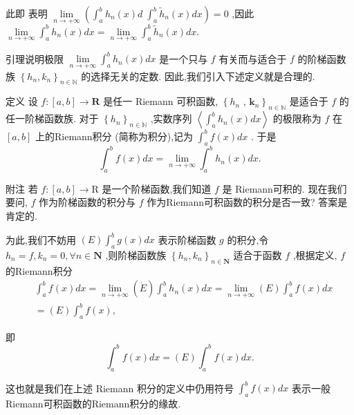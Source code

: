 此即 表明 $\mathop{\lim }\limits_{{n \rightarrow   + \infty }}\left( {{\int }_{a}^{b}{h}_{n}\left( x\right) d\;{\int }_{a}^{b}{\widetilde{h}}_{n}\left( x\right) {dx}}\right)  = 0$ ,因此 $\mathop{\lim }\limits_{{n \rightarrow   + \infty }}{\int }_{a}^{b}{h}_{n}\left( x\right) {dx} = \mathop{\lim }\limits_{{n \rightarrow   + \infty }}{\int }_{a}^{b}{\widetilde{h}}_{n}\left( x\right) {dx}.$

引理说明极限 $\mathop{\lim }\limits_{{n \rightarrow   + \infty }}{\int }_{a}^{b}{h}_{n}\left( x\right) {dx}$ 是一个只与 $f$ 有关而与适合于 $f$ 的阶梯函数族 ${\left\{  {h}_{n},{k}_{n}\right\}  }_{n \in  \mathbb{N}}$ 的选择无关的定数. 因此,我们引入下述定义就是合理的.

定义 设 $f : \left\lbrack  {a,b}\right\rbrack   \rightarrow  \mathbf{R}$ 是任一 Riemann 可积函数, $\left\{  {h}_{n}\right.$ , ${\left. {\mathbf{k}}_{n}\right\}  }_{n \in  \mathbb{N}}$ 是适合于 $f$ 的任一阶梯函数族. 对于 ${\left\{  {h}_{n}\right\}  }_{n \in  \mathbb{N}}$ ,实数序列 $\left\langle  {{\int }_{a}^{b}{h}_{n}\left( x\right) {dx}}\right\rangle$ 的极限称为 $f$ 在 $\left\lbrack  {a,b}\right\rbrack$ 上的Riemann积分 (简称为积分),记为 ${\int }_{a}^{b}f\left( x\right) {dx}$ . 于是
$${\int }_{a}^{b}f\left( x\right) {dx} = \mathop{\lim }\limits_{{n \rightarrow   + \infty }}{\int }_{a}^{b}{h}_{n}\left( x\right) {dx}.$$

附注 若 $f : \left\lbrack  {a,b}\right\rbrack   \rightarrow  \mathrm{R}$ 是一个阶梯函数,我们知道 $f$ 是 Riemann可积的. 现在我们要问, $f$ 作为阶梯函数的积分与 $f$ 作为Riemann可积函数的积分是否一致? 答案是肯定的.

为此,我们不妨用 $\left( E\right) {\int }_{a}^{b}g\left( x\right) {dx}$ 表示阶梯函数 $g$ 的积分,令 ${h}_{n} = f,{k}_{n} = 0,\forall n \in  \mathbf{N}$ ,则阶梯函数族 ${\left\{  {h}_{n},{k}_{n}\right\}  }_{n \in  \mathbf{N}}$ 适合于函数 $f$ ,根据定义, $f$ 的Riemann积分
\begin{align*}
	&{\int }_{a}^{b}f\left( x\right) {dx} = \mathop{\lim }\limits_{{n \rightarrow   + \infty }}\left( \dot{E}\right) {\int }_{a}^{b}{h}_{n}\left( x\right) {dx} = \mathop{\lim }\limits_{{n \rightarrow   + \infty }}\left( E\right) {\int }_{a}^{b}f\left( x\right) {dx}\\
	&= \left( E\right) {\int }_{a}^{b}f\left( x\right) ,
\end{align*}

即
$${\int }_{a}^{b}f\left( x\right) {dx} = \left( E\right) {\int }_{a}^{b}f\left( x\right) {dx}.$$

这也就是我们在上述 Riemann 积分的定义中仍用符号 ${\int }_{a}^{b}f\left( x\right) {dx}$ 表示一般Riemann可积函数的Riemann积分的缘故.


